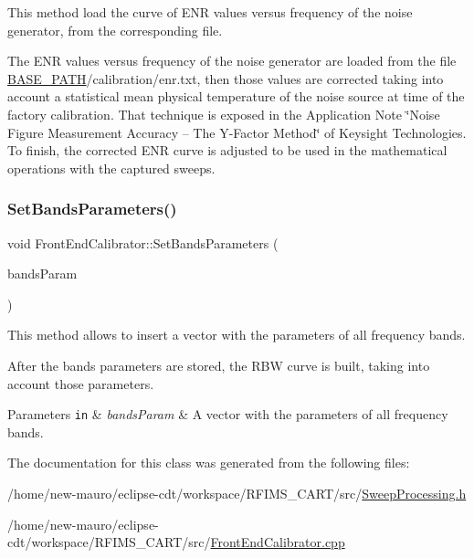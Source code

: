 This method load the curve of E\+NR values versus frequency of the noise generator, from the corresponding file. 

The E\+NR values versus frequency of the noise generator are loaded from the file \hyperlink{Basics_8h_a0423f4cb393331ce0b9f6b3a43adcaae}{B\+A\+S\+E\+\_\+\+P\+A\+TH}/calibration/enr.txt, then those values are corrected taking into account a statistical mean physical temperature of the noise source at time of the factory calibration. That technique is exposed in the Application Note \char`\"{}\+Noise Figure Measurement Accuracy – The Y-\/\+Factor
\+Method\char`\"{} of Keysight Technologies. To finish, the corrected E\+NR curve is adjusted to be used in the mathematical operations with the captured sweeps. \mbox{\label{classFrontEndCalibrator_a6fcf8e8343878614d1b03910bb97a3d6}} 
\subsubsection{\texorpdfstring{Set\+Bands\+Parameters()}{SetBandsParameters()}}
{\footnotesize\ttfamily void Front\+End\+Calibrator\+::\+Set\+Bands\+Parameters (\begin{DoxyParamCaption}\item[{const std\+::vector$<$ \hyperlink{structBandParameters}{Band\+Parameters} $>$ \&}]{bands\+Param }\end{DoxyParamCaption})}



This method allows to insert a vector with the parameters of all frequency bands. 

After the bands\textquotesingle{} parameters are stored, the R\+BW curve is built, taking into account those parameters. 
\begin{DoxyParams}[1]{Parameters}
\mbox{\tt in}  & {\em bands\+Param} & A vector with the parameters of all frequency bands. \\
\hline
\end{DoxyParams}


The documentation for this class was generated from the following files\+:\begin{DoxyCompactItemize}
\item 
/home/new-\/mauro/eclipse-\/cdt/workspace/\+R\+F\+I\+M\+S\+\_\+\+C\+A\+R\+T/src/\hyperlink{SweepProcessing_8h}{Sweep\+Processing.\+h}\item 
/home/new-\/mauro/eclipse-\/cdt/workspace/\+R\+F\+I\+M\+S\+\_\+\+C\+A\+R\+T/src/\hyperlink{FrontEndCalibrator_8cpp}{Front\+End\+Calibrator.\+cpp}\end{DoxyCompactItemize}
